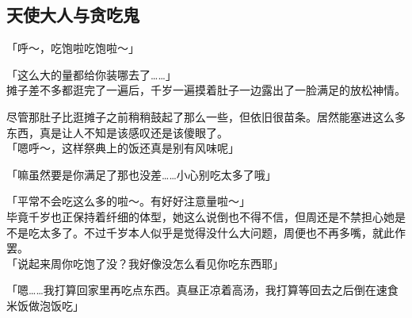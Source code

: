 \subsection{天使大人与贪吃鬼}

「呼～，吃饱啦吃饱啦～」

「这么大的量都给你装哪去了……」\\

摊子差不多都逛完了一遍后，千岁一遍摸着肚子一边露出了一脸满足的放松神情。

尽管那肚子比逛摊子之前稍稍鼓起了那么一些，但依旧很苗条。居然能塞进这么多东西，真是让人不知是该感叹还是该傻眼了。\\

「嗯呼～，这样祭典上的饭还真是别有风味呢」

「嘛虽然要是你满足了那也没差……小心别吃太多了哦」

「平常不会吃这么多的啦～。有好好注意量啦～」\\

毕竟千岁也正保持着纤细的体型，她这么说倒也不得不信，但周还是不禁担心她是不是吃太多了。不过千岁本人似乎是觉得没什么大问题，周便也不再多嘴，就此作罢。\\

「说起来周你吃饱了没？我好像没怎么看见你吃东西耶」

「嗯……我打算回家里再吃点东西。真昼正凉着高汤，我打算等回去之后倒在速食米饭做泡饭吃」

